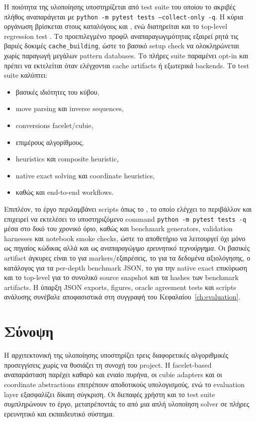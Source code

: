 Η ποιότητα της υλοποίησης υποστηρίζεται από test suite του οποίου το ακριβές
πλήθος αναπαράγεται με \texttt{python -m pytest tests --collect-only -q}.
Η κύρια οργάνωση βρίσκεται στους καταλόγους  και
, ενώ διατηρείται και το top-level regression test
. Το προεπιλεγμένο προφίλ
αναπαραγωγιμότητας εξαιρεί ρητά τις βαριές δοκιμές \texttt{cache\_building}, ώστε το βασικό
setup check να ολοκληρώνεται χωρίς παραγωγή μεγάλων pattern databases. Το πλήρες
suite παραμένει opt-in και πρέπει να εκτελείται όταν ελέγχονται cache artifacts
ή εξωτερικά backends. Το test suite καλύπτει:
\begin{itemize}
    \item βασικές ιδιότητες του κύβου,
    \item move parsing και inverse sequences,
    \item conversions facelet/cubie,
    \item επιμέρους αλγορίθμους,
    \item heuristics και composite heuristic,
    \item native exact solving και coordinate heuristics,
    \item καθώς και end-to-end workflows.
\end{itemize}

Επιπλέον, το έργο περιλαμβάνει scripts όπως το , το οποίο ελέγχει το περιβάλλον και επιχειρεί να εκτελέσει το υποστηριζόμενο command \texttt{python -m pytest tests -q} μέσα στο δικό του χρονικό όριο, καθώς και benchmark generators, validation harnesses και notebook smoke checks, ώστε το αποθετήριο να λειτουργεί όχι μόνο ως πηγαίος κώδικας αλλά και ως \emph{αναπαραγώγιμο ερευνητικό τεχνούργημα}. Οι βασικές artifact άγκυρες είναι το  για markers/εξαιρέσεις, το  για τα δεδομένα αξιολόγησης, ο κατάλογος  για τα per-depth benchmark JSON, το  για την native exact επικύρωση και το top-level  για το συνολικό source snapshot και τα hashes των benchmark artifacts. Η ύπαρξη JSON exports, figures, oracle agreement tests και scripts ανάλυσης συνέβαλε αποφασιστικά στη συγγραφή του Κεφαλαίου~\ref{ch:evaluation}.

\section{Σύνοψη}

Η αρχιτεκτονική της υλοποίησης υποστηρίζει τρεις διαφορετικές αλγοριθμικές προσεγγίσεις χωρίς να θυσιάζει τη συνοχή του project. Η facelet-based αναπαράσταση παρέχει καθαρό και ενιαίο πυρήνα, οι cubie adapters και οι coordinate abstractions επιτρέπουν αποδοτικούς υπολογισμούς, ενώ το evaluation layer εξασφαλίζει δίκαιη σύγκριση. Οι διεπαφές χρήστη και το test suite συμπληρώνουν το έργο, μετατρέποντάς το από μια απλή υλοποίηση solver σε πλήρες ερευνητικό και εκπαιδευτικό σύστημα.

